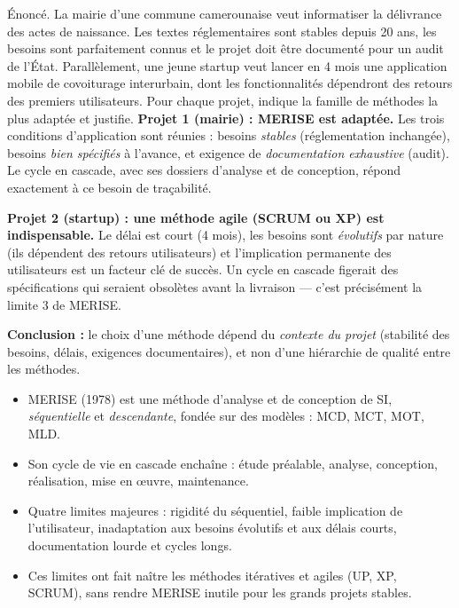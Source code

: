 \documentclass[11pt]{article}
\begin{document}
\begin{exoresolu}
Énoncé. La mairie d'une commune camerounaise veut informatiser la délivrance des actes de naissance. Les textes réglementaires sont stables depuis 20 ans, les besoins sont parfaitement connus et le projet doit être documenté pour un audit de l'État. Parallèlement, une jeune startup veut lancer en 4 mois une application mobile de covoiturage interurbain, dont les fonctionnalités dépendront des retours des premiers utilisateurs. Pour chaque projet, indique la famille de méthodes la plus adaptée et justifie.
\tcblower
\textbf{Projet 1 (mairie) : MERISE est adaptée.} Les trois conditions d'application sont réunies : besoins \emph{stables} (réglementation inchangée), besoins \emph{bien spécifiés} à l'avance, et exigence de \emph{documentation exhaustive} (audit). Le cycle en cascade, avec ses dossiers d'analyse et de conception, répond exactement à ce besoin de traçabilité.

\textbf{Projet 2 (startup) : une méthode agile (SCRUM ou XP) est indispensable.} Le délai est court (4 mois), les besoins sont \emph{évolutifs} par nature (ils dépendent des retours utilisateurs) et l'implication permanente des utilisateurs est un facteur clé de succès. Un cycle en cascade figerait des spécifications qui seraient obsolètes avant la livraison — c'est précisément la limite 3 de MERISE.

\textbf{Conclusion :} le choix d'une méthode dépend du \emph{contexte du projet} (stabilité des besoins, délais, exigences documentaires), et non d'une hiérarchie de qualité entre les méthodes.
\end{exoresolu}

\begin{aretenir}
\begin{itemize}
  \item MERISE (1978) est une méthode d'analyse et de conception de SI, \emph{séquentielle} et \emph{descendante}, fondée sur des modèles : MCD, MCT, MOT, MLD.
  \item Son cycle de vie en cascade enchaîne : étude préalable, analyse, conception, réalisation, mise en œuvre, maintenance.
  \item Quatre limites majeures : rigidité du séquentiel, faible implication de l'utilisateur, inadaptation aux besoins évolutifs et aux délais courts, documentation lourde et cycles longs.
  \item Ces limites ont fait naître les méthodes itératives et agiles (UP, XP, SCRUM), sans rendre MERISE inutile pour les grands projets stables.
\end{itemize}
\end{aretenir}
\end{document}
